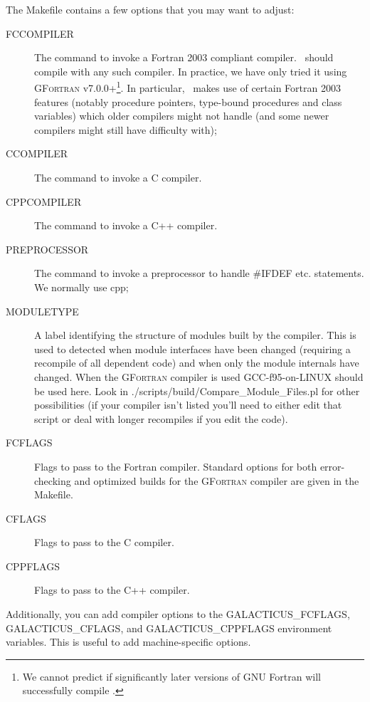 The {\normalfont \ttfamily Makefile} contains a few options that you may want to adjust:
\begin{description}
 \item[{\normalfont \ttfamily FCCOMPILER}] The command to invoke a Fortran 2003 compliant compiler. \glc\ should compile with any such compiler. In practice, we have only tried it using {\normalfont \scshape GFortran} v7.0.0+\footnote{We cannot predict if significantly later versions of GNU Fortran will successfully compile \protect\glc.}. In particular, \glc\ makes use of certain Fortran 2003 features (notably procedure pointers, type-bound procedures and class variables) which older compilers might not handle (and some newer compilers might still have difficulty with);
 \item[{\normalfont \ttfamily CCOMPILER}] The command to invoke a C compiler.
 \item[{\normalfont \ttfamily CPPCOMPILER}] The command to invoke a C++ compiler.
 \item[{\normalfont \ttfamily PREPROCESSOR}] The command to invoke a preprocessor to handle {\normalfont \ttfamily \#IFDEF} etc. statements. We normally use {\normalfont \ttfamily cpp};
 \item[{\normalfont \ttfamily MODULETYPE}] A label identifying the structure of modules built by the compiler. This is used to detected when module interfaces have been changed (requiring a recompile of all dependent code) and when only the module internals have changed. When the {\normalfont \scshape GFortran} compiler is used {\normalfont \ttfamily GCC-f95-on-LINUX} should be used here. Look in {\normalfont \ttfamily ./scripts/build/Compare\_Module\_Files.pl} for other possibilities (if your compiler isn't listed you'll need to either edit that script or deal with longer recompiles if you edit the code).
 \item[{\normalfont \ttfamily FCFLAGS}] Flags to pass to the Fortran compiler. Standard options for both error-checking and optimized builds for the {\normalfont \scshape GFortran} compiler are given in the {\normalfont \ttfamily Makefile}.
 \item[{\normalfont \ttfamily CFLAGS}] Flags to pass to the C compiler.
 \item[{\normalfont \ttfamily CPPFLAGS}] Flags to pass to the C++ compiler.
\end{description}
Additionally, you can add compiler options to the {\normalfont \ttfamily GALACTICUS\_FCFLAGS}, {\normalfont \ttfamily GALACTICUS\_CFLAGS}, and {\normalfont \ttfamily GALACTICUS\_CPPFLAGS} environment variables. This is useful to add machine-specific options.

